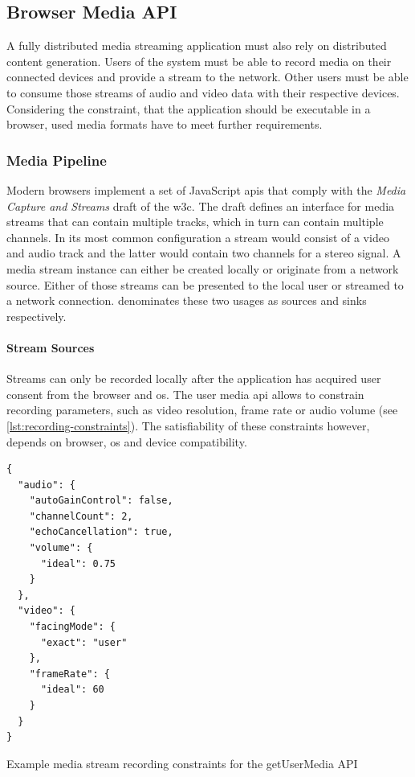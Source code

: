 \subsection{Browser Media API}

A fully distributed media streaming application must also rely on distributed content generation. Users of the system must be able to record media on their connected devices and provide a stream to the network. Other users must be able to consume those streams of audio and video data with their respective devices. Considering the constraint, that the application should be executable in a browser, used media formats have to meet further requirements.

\subsubsection{Media Pipeline}
\label{browser-api}

Modern browsers implement a set of JavaScript \glspl{api} that comply with the {\textit{Media Capture and Streams}} draft \citep{media-capture-and-streams} of the \gls{w3c}. The draft defines an interface for media streams that can contain multiple tracks, which in turn can contain multiple channels. In its most common configuration a stream would consist of a video and audio track and the latter would contain two channels for a stereo signal. A media stream instance can either be created locally or originate from a network source. Either of those streams can be presented to the local user or streamed to a network connection. \citet{media-capture-and-streams} denominates these two usages as sources and sinks respectively.

\paragraph{Stream Sources}
Streams can only be recorded locally after the application has acquired user consent from the browser and \gls{os}. The user media \gls{api} \cite{TODO} allows to constrain recording parameters, such as video resolution, frame rate or audio volume (see \ref{lst:recording-constraints}). The satisfiability of these constraints however, depends on browser, \gls{os} and device compatibility.

\begin{Listing}
\begin{lstlisting}
{
  "audio": {
    "autoGainControl": false,
    "channelCount": 2,
    "echoCancellation": true,
    "volume": {
      "ideal": 0.75
    }
  },
  "video": {
    "facingMode": {
      "exact": "user"
    },
    "frameRate": {
      "ideal": 60
    }
  }
}
\end{lstlisting}
\caption{Example media stream recording constraints for the getUserMedia API}
\label{lst:recording-constraints}
\end{Listing}

